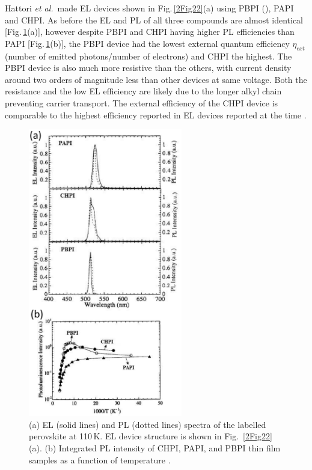 Hattori \textit{et al.}\ made EL devices shown in Fig.\,\ref{2Fig22}(a) using PBPI (), PAPI and CHPI. As before the EL and PL of all three compounds are almost identical [Fig.\,\ref{2Fig23}(a)], however despite PBPI and CHPI having higher PL efficiencies than PAPI [Fig.\,\ref{2Fig23}(b)], the PBPI device had the lowest external quantum efficiency $\eta_{ext}$ (number of emitted photons/number of electrons) and CHPI the highest. The PBPI device is also much more resistive than the others, with current density around two orders of magnitude less than other devices at same voltage. Both the resistance and the low EL efficiency are likely due to the longer alkyl chain preventing carrier transport. The external efficiency of the CHPI device is comparable to the highest efficiency reported in EL devices reported at the time \cite{Hattori1996}.
\begin{figure}[h!]
\centering
\includegraphics[width=0.6\textwidth]{Fig23}
\caption{(a) EL (solid lines) and PL (dotted lines) spectra of the labelled perovskite at 110\,K. EL device structure is shown in Fig.\ \ref{2Fig22}(a). (b) Integrated PL intensity of CHPI, PAPI, and PBPI thin film samples as a function of temperature \cite{Hattori1996}.}
\label{2Fig23}
\end{figure}

